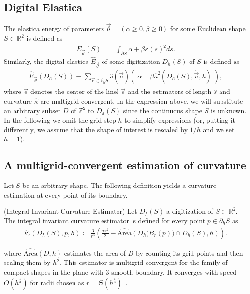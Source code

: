 \documentclass[runningheads]{llncs}
\newcommand{\Ds}{D}
\begin{document}
\subsection{Digital Elastica}
The elastica energy of parameters $\vec{\theta}=(\alpha \geq 0, \beta \geq 0)$ for some Euclidean shape
$S \subset \mathbb{R}^2$ is defined as
	\begin{align*}
	E_{\vec{\theta}}(S) &= \int_{\partial S}{ \alpha + \beta \kappa(s)^2 ds}.
	\end{align*}
Similarly, the digital elastica $\hat{E}_{\vec{\theta}}$ of some digitization $D_h(S)$ of $S$ is defined as
	\begin{align}
	\hat{E}_{\vec{\theta}}( D_h(S) ) = \sum_{\dot{\vec{e}} \in \partial_h S}{ \hat{s}( \dot{\vec{e}})\left(\; \alpha + \beta \hat{\kappa}^2(D_h(S),\dot{\vec{e}},h) \; \right)},
	\label{ch5:digital-elastica}
	\end{align}
where $\dot{\vec{e}}$ denotes the center of the linel $\vec{e}$ and the estimators of length $\hat{s}$ and
curvature $\hat{\kappa}$ are multigrid convergent. In the expression above, we will substitute an arbitrary
subset $\Ds$ of $\mathbb{Z}^2$ to $D_h(S)$ since the continuous shape $S$ is unknown.  In the following we omit
the grid step $h$ to simplify expressions (or, putting it differently, we assume that the shape of interest is
rescaled by $1/h$ and we set $h=1$).


\subsection{A multigrid-convergent estimation of curvature}    
Let $S$ be an arbitrary shape. The following definition yields a curvature estimation at every point of its boundary.

\begin{definition}{(Integral Invariant Curvature Estimator)}
  Let $D_h(S)$ a digitization of $S \subset \mathbb{R}^2$. The integral invariant curvature estimator is defined for
  every point $p \in \partial_h S$ as
  \begin{align*}
    \hat{\kappa}_{r}(D_h(S),p,h) \coloneqq \frac{3}{r^3} \left( \frac{\pi r^2}{2} - \widehat{\text{Area}} \left( D_h\big( B_{r} ( p ) \big) \cap D_h(S), h \right) \right).
  \end{align*}
\end{definition}
%
where $\widehat{\text{Area}}( D,h )$ estimates the area of $D$ by counting its grid points and then scaling them by
$h^2$. This estimator is multigrid convergent for the family of compact shapes in the plane with $3$-smooth boundary. It
converges with speed $O(h^\frac{1}{3})$ for radii chosen as $r=\Theta(h^\frac{1}{3})$~\cite{lachaud17robust}.
\end{document}

